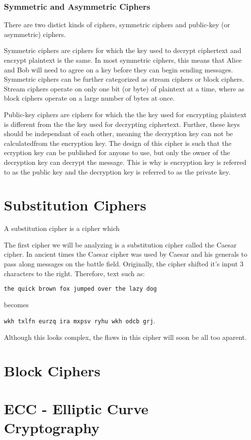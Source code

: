 \documentclass[12pt, a4paper, draft]{report}
\begin{document}
\subsubsection{Symmetric and Asymmetric Ciphers}

There are two distict kinds of ciphers, symmetric ciphers and public-key
(or asymmetric) ciphers.

Symmetric ciphers are ciphers for which the key used to decrypt ciphertext
and encrypt plaintext is the same. In most symmetric ciphers, this means
that Alice and Bob will need to agree on a key before they can begin
sending messages. Symmetric ciphers can be further categorized as stream
ciphers or block ciphers. Stream ciphers operate on only one bit (or byte)
of plaintext at a time, where as block ciphers operate on a large number
of bytes at once.

Public-key ciphers are ciphers for which the the key used for encrypting
plaintext is different from the the key used for decrypting ciphertext.
Further, these keys should be independant of each other, meaning the
decryption key can not be calculated\footnotemark from the encryption key.
The design of this cipher is such that the ecryption key can be published
for anyone to use, but only the owner of the decryption key can decrypt
the message. This is why is encryption key is referred to as the public
key and the decryption key is referred to as the private key.





\section{Substitution Ciphers}


A substitution cipher is a cipher which

The first cipher we will be analyzing is a substitution cipher called
the Caesar cipher. In ancient times the Caesar cipher was used by Caesar
and his generals to pass along messages on the battle field. Originally,
the cipher shifted it's input 3 characters to the right. Therefore, text
such as:

\texttt{the quick brown fox jumped over the lazy dog}

becomes

\texttt{wkh txlfn eurzq ira mxpsv ryhu wkh odcb grj}.

Although this looks complex, the flaws in this cipher will soon be all
too aparent.

\section{Block Ciphers}

\section{ECC - Elliptic Curve Cryptography}
\end{document}
